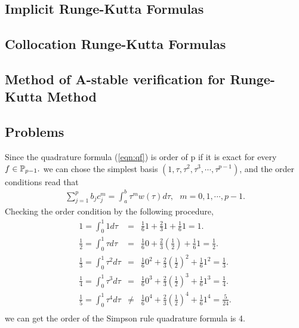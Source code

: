 \documentclass[12pt]  {article}%
\begin{document}
\subsection{Implicit Runge-Kutta Formulas}
\subsection{Collocation Runge-Kutta Formulas}
\subsection{Method of A-stable  verification for Runge-Kutta Method }
\subsection{Problems}
\begin{solution}
Since the quadrature formula (\ref{eqn:qf}) is order of p if it is exact for every $f\in\mathbb{P}_{p-1}.$ we can
chose the simplest basis $(1, \tau, \tau^2,\tau^3,\cdots, \tau^{p-1})$, and the order conditions read that
\begin{eqnarray}
\sum_{j=1}^pb_jc_j^m=\int_a^b \tau^mw(\tau)d\tau, ~~~m=0,1,\cdots, p-1.
\end{eqnarray}
Checking the order condition by the following procedure,
\begin{eqnarray*}
  1=\int_0^1 1 d\tau &=&  \frac{1}{6}1+\frac{2}{3}1+\frac{1}{6}1=1.\\
\frac{1}{2}=\int_0^1 \tau d\tau &=&  \frac{1}{6}0+\frac{2}{3}\left(\frac{1}{2}\right)+\frac{1}{6}1=\frac{1}{2}.\\
  \frac{1}{3}=\int_0^1 \tau^2 d\tau &=&  \frac{1}{6}0^2+\frac{2}{3}\left(\frac{1}{2}\right)^2+\frac{1}{6}1^2=\frac{1}{3}.\\
\frac{1}{4}=\int_0^1 \tau^3 d\tau &=&  \frac{1}{6}0^3+\frac{2}{3}\left(\frac{1}{2}\right)^3+\frac{1}{6}1^3=\frac{1}{4}.\\
\frac{1}{5}=\int_0^1 \tau^4 d\tau &\neq&  \frac{1}{6}0^4+\frac{2}{3}\left(\frac{1}{2}\right)^4+\frac{1}{6}1^4=\frac{5}{24}.\\
\end{eqnarray*}
 we can get the order of the Simpson rule quadrature formula is 4.
\end{solution}
\end{document}

